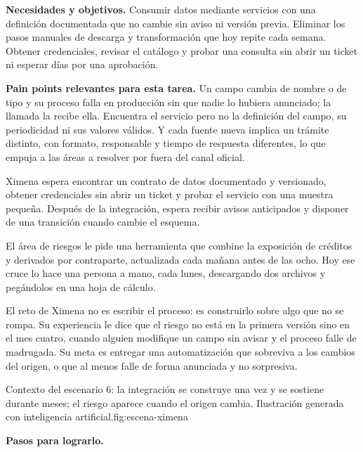 \textbf{\textcolor{uxnavy}{Necesidades y objetivos.}} Consumir datos mediante servicios con
una definición documentada que no cambie sin aviso ni versión previa. Eliminar los pasos
manuales de descarga y transformación que hoy repite cada semana. Obtener credenciales,
revisar el catálogo y probar una consulta sin abrir un ticket ni esperar días por una
aprobación.

\textbf{\textcolor{uxnavy}{Pain points relevantes para esta tarea.}} Un campo cambia de nombre
o de tipo y su proceso falla en producción sin que nadie lo hubiera anunciado; la llamada la
recibe ella. Encuentra el servicio pero no la definición del campo, su periodicidad ni sus
valores válidos. Y cada fuente nueva implica un trámite distinto, con formato, responsable y
tiempo de respuesta diferentes, lo que empuja a las áreas a resolver por fuera del canal
oficial.


Ximena espera encontrar un contrato de datos documentado y versionado, obtener credenciales
sin abrir un ticket y probar el servicio con una muestra pequeña. Después de la integración,
espera recibir avisos anticipados y disponer de una transición cuando cambie el esquema.


El área de riesgos le pide una herramienta que combine la exposición de créditos y derivados
por contraparte, actualizada cada mañana antes de las ocho. Hoy ese cruce lo hace una persona a
mano, cada lunes, descargando dos archivos y pegándolos en una hoja de cálculo.

El reto de Ximena no es escribir el proceso: es construirlo sobre algo que no se rompa. Su
experiencia le dice que el riesgo no está en la primera versión sino en el mes cuatro, cuando
alguien modifique un campo sin avisar y el proceso falle de madrugada. Su meta es entregar una
automatización que sobreviva a los cambios del origen, o que al menos falle de forma anunciada
y no sorpresiva.

  {Contexto del escenario 6: la integración se construye una vez y se sostiene durante meses;
   el riesgo aparece cuando el origen cambia. Ilustración generada con inteligencia
   artificial.}{fig:escena-ximena}

\textbf{\textcolor{uxnavy}{Pasos para lograrlo.}}

